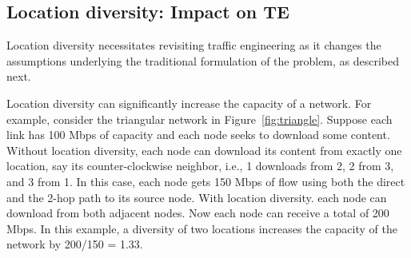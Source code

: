 



\subsection{Location diversity: Impact on TE}

Location diversity necessitates revisiting traffic engineering as it changes the assumptions underlying the traditional formulation of the problem, as described next.

Location diversity can significantly increase the capacity of a network. For example, consider the triangular network in Figure~\ref{fig:triangle}. Suppose each link has 100 Mbps of capacity and each node seeks to download some content.
Without location diversity, each node can download its content from exactly one location, say its counter-clockwise neighbor, i.e., 1 downloads from 2, 2 from 3, and 3 from 1. In this case, each node gets 150 Mbps of flow using both the direct and the 2-hop path to its source node. With location diversity. 
each node can download from both adjacent nodes. Now each node can receive a total of 200 Mbps. In this example, a diversity of two locations increases the capacity of the network by 200/150 = 1.33. 



%

